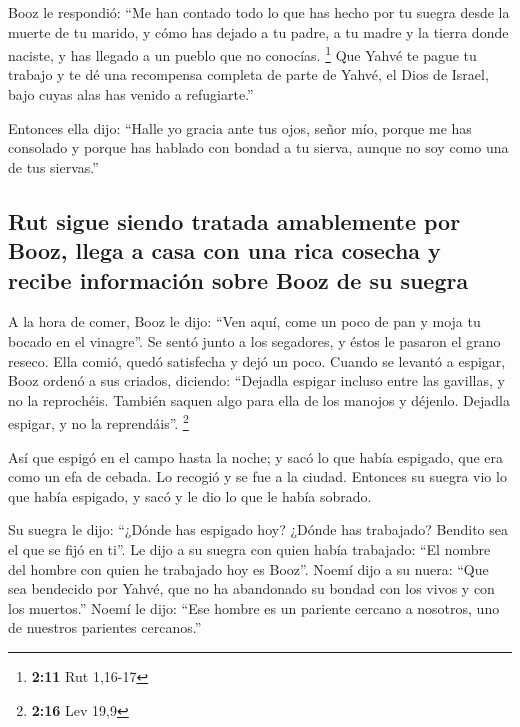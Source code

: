  Booz le respondió: ``Me han contado todo lo que has
hecho por tu suegra desde la muerte de tu marido, y cómo has dejado a tu
padre, a tu madre y la tierra donde naciste, y has llegado a un pueblo
que no conocías. \footnote{\textbf{2:11} Rut 1,16-17} 
Que Yahvé te pague tu trabajo y te dé una recompensa completa de parte
de Yahvé, el Dios de Israel, bajo cuyas alas has venido a refugiarte.''

 Entonces ella dijo: ``Halle yo gracia ante tus ojos,
señor mío, porque me has consolado y porque has hablado con bondad a tu
sierva, aunque no soy como una de tus siervas.''

\hypertarget{rut-sigue-siendo-tratada-amablemente-por-booz-llega-a-casa-con-una-rica-cosecha-y-recibe-informaciuxf3n-sobre-booz-de-su-suegra}{%
\subsection{Rut sigue siendo tratada amablemente por Booz, llega a casa
con una rica cosecha y recibe información sobre Booz de su
suegra}\label{rut-sigue-siendo-tratada-amablemente-por-booz-llega-a-casa-con-una-rica-cosecha-y-recibe-informaciuxf3n-sobre-booz-de-su-suegra}}

 A la hora de comer, Booz le dijo: ``Ven aquí, come un
poco de pan y moja tu bocado en el vinagre''. Se sentó junto a los
segadores, y éstos le pasaron el grano reseco. Ella comió, quedó
satisfecha y dejó un poco.  Cuando se levantó a espigar,
Booz ordenó a sus criados, diciendo: ``Dejadla espigar incluso entre las
gavillas, y no la reprochéis.  También saquen algo para
ella de los manojos y déjenlo. Dejadla espigar, y no la reprendáis''.
\footnote{\textbf{2:16} Lev 19,9}

 Así que espigó en el campo hasta la noche; y sacó lo que
había espigado, que era como un efa de cebada.  Lo
recogió y se fue a la ciudad. Entonces su suegra vio lo que había
espigado, y sacó y le dio lo que le había sobrado.

 Su suegra le dijo: ``¿Dónde has espigado hoy? ¿Dónde has
trabajado? Bendito sea el que se fijó en ti''. Le dijo a su suegra con
quien había trabajado: ``El nombre del hombre con quien he trabajado hoy
es Booz''.  Noemí dijo a su nuera: ``Que sea bendecido
por Yahvé, que no ha abandonado su bondad con los vivos y con los
muertos.'' Noemí le dijo: ``Ese hombre es un pariente cercano a
nosotros, uno de nuestros parientes cercanos.''

